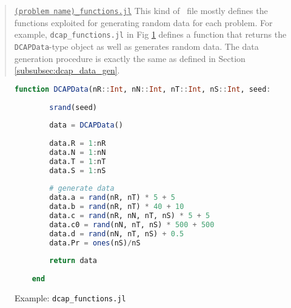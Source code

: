 \begin{quote}
\noindent\underline{\texttt{(problem name)\_functions.jl}} This kind of \julia\ file mostly defines the functions exploited for generating random data for each problem. For example, \texttt{dcap\_functions.jl} in Fig \ref{fig:dcap_functions} defines a function that returns the \texttt{DCAPData}-type object as well as generates random data. The data generation procedure is exactly the same as defined in Section \ref{subsubsec:dcap_data_gen}.
\end{quote}
\begin{figure}[H]
	\centering
	\begin{lstlisting}[frame=single,language=julia]
	function DCAPData(nR::Int, nN::Int, nT::Int, nS::Int, seed::Int=1)::DCAPData
	
		srand(seed)
		
		data = DCAPData()
		
		data.R = 1:nR
		data.N = 1:nN
		data.T = 1:nT
		data.S = 1:nS
		
		# generate data
		data.a = rand(nR, nT) * 5 + 5
		data.b = rand(nR, nT) * 40 + 10
		data.c = rand(nR, nN, nT, nS) * 5 + 5
		data.c0 = rand(nN, nT, nS) * 500 + 500
		data.d = rand(nN, nT, nS) + 0.5
		data.Pr = ones(nS)/nS
		
		return data
		
	end
	\end{lstlisting}
	\caption{Example: \texttt{dcap\_functions.jl}}\label{fig:dcap_functions}
\end{figure}


